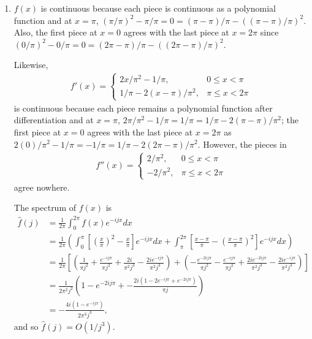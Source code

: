 \documentclass[a4paper,12pt]{article}
\begin{document}
\begin{enumerate}
    \item
        $f(x)$ is continuous because each piece is continuous as a polynomial function and at $x = \pi$, $(\pi/\pi)^2 - \pi/\pi = 0 = (\pi - \pi)/\pi - ((\pi - \pi)/\pi)^2$. Also, the first piece at $x = 0$ agrees with the last piece at $x = 2\pi$ since $(0/\pi)^2 - 0/\pi = 0 = (2\pi - \pi)/\pi - ((2\pi - \pi)/\pi)^2$. \par
        Likewise,
        \begin{align*}
            f'(x) = \begin{cases}
                2x/\pi^2 - 1/\pi, &0 \leq x < \pi \\
                1/\pi - 2(x - \pi)/\pi^2, &\pi \leq x < 2\pi
            \end{cases}
        \end{align*}
        is continuous because each piece remains a polynomial function after differentiation and at $x = \pi$, $2\pi/\pi^2 - 1/\pi = 1/\pi = 1/\pi - 2(\pi - \pi)/\pi^2$; the first piece at $x = 0$ agrees with the last piece at $x = 2\pi$ as $2(0)/\pi^2 - 1/\pi = -1/\pi = 1/\pi - 2(2\pi - \pi)/\pi^2$.
        However, the pieces in
        \begin{align*}
            f''(x) = \begin{cases}
                2/\pi^2, &0 \leq x < \pi \\
                -2/\pi^2, &\pi \leq x < 2\pi
            \end{cases}
        \end{align*}
        agree nowhere. \par
        The spectrum of $f(x)$ is
        \begin{align*}
            \hat{f}(j) &= \frac{1}{2\pi} \int_0^{2\pi} f(x) e^{-ijx} dx \\
            &= \frac{1}{2\pi} \left( \int_0^{\pi} \left[ \left( \frac{x}{\pi} \right)^2 - \frac{x}{\pi} \right] e^{-ijx} dx + \int_\pi^{2\pi} \left[ \frac{x - \pi}{\pi} - \left( \frac{x - \pi}{\pi} \right)^2 \right] e^{-ijx} dx \right) \\
            &= \frac{1}{2\pi} \left[ \left( \frac{1}{\pi j^2} + \frac{e^{-ij\pi}}{\pi j^2} + \frac{2i}{\pi^2 j^3} - \frac{2i e^{-ij\pi}}{\pi^2 j^3} \right) + \left( -\frac{e^{-2ij\pi}}{\pi j^2} - \frac{e^{-ij\pi}}{\pi j^2} + \frac{2ie^{-2ij\pi}}{\pi^2 j^3} - \frac{2i e^{-ij\pi}}{\pi^2 j^3} \right) \right] \\
            &= \frac{1}{2\pi^2 j^2} \left( 1 - e^{-2ij\pi} + -\frac{2i(1 - 2e^{-ij\pi} + e^{-2ij\pi})}{\pi j} \right) \\
            &= -\frac{4i(1 - e^{-ij\pi})}{2\pi^3 j^3},
        \end{align*}
        and so $\hat{f}(j) = O(1/j^3)$.


\end{enumerate}
\end{document}
